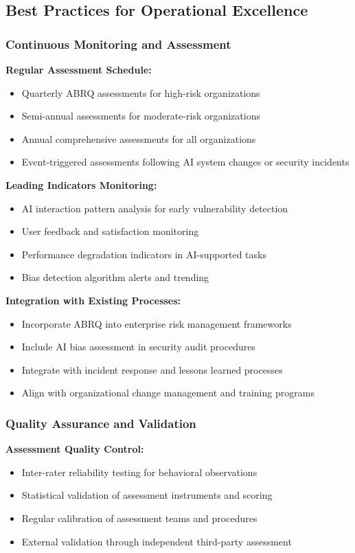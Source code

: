 \documentclass[11pt,a4paper]{article}
\begin{document}
\subsection{Best Practices for Operational Excellence}

\subsubsection{Continuous Monitoring and Assessment}

\textbf{Regular Assessment Schedule:}
\begin{itemize}
\item Quarterly ABRQ assessments for high-risk organizations
\item Semi-annual assessments for moderate-risk organizations
\item Annual comprehensive assessments for all organizations
\item Event-triggered assessments following AI system changes or security incidents
\end{itemize}

\textbf{Leading Indicators Monitoring:}
\begin{itemize}
\item AI interaction pattern analysis for early vulnerability detection
\item User feedback and satisfaction monitoring
\item Performance degradation indicators in AI-supported tasks
\item Bias detection algorithm alerts and trending
\end{itemize}

\textbf{Integration with Existing Processes:}
\begin{itemize}
\item Incorporate ABRQ into enterprise risk management frameworks
\item Include AI bias assessment in security audit procedures
\item Integrate with incident response and lessons learned processes
\item Align with organizational change management and training programs
\end{itemize}

\subsubsection{Quality Assurance and Validation}

\textbf{Assessment Quality Control:}
\begin{itemize}
\item Inter-rater reliability testing for behavioral observations
\item Statistical validation of assessment instruments and scoring
\item Regular calibration of assessment teams and procedures
\item External validation through independent third-party assessment
\end{itemize}
\end{document}
